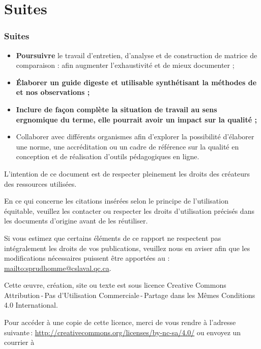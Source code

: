 					\section{Suites} 
						\begin{frame}[allowframebreaks]
						\frametitle{Suites}
                        			
                        			\begin{itemize}
                        			\item \textbf{Poursuivre} le travail d’entretien, d’analyse et de construction de matrice de comparaison : afin augmenter l’exhaustivité et de mieux documenter ;
                        			\item \textbf{Élaborer un guide digeste et utilisable synthétisant la méthodes de \citet{bonneau2013a} et nos observations ;}
                        			\item \textbf{Inclure de façon complète la situation de travail au sens ergnomique du terme, elle pourrait avoir un impact sur la qualité ;}
						\item Collaborer avec différents organismes afin d’explorer la possibilité d’élaborer une norme, une accréditation ou un cadre de référence sur la qualité en conception et de réalisation d’outils pédagogiques en ligne.
                        				
						\end{itemize}
						\end{frame}									
						
\framebreak
\par L’intention de ce document est de respecter pleinement les droits des créateurs des ressources
utilisées.
	\par En ce qui concerne les citations insérées selon le principe de l'utilisation équitable, veuillez les contacter ou respecter les droits d’utilisation précisés dans les documents d’origine avant de les réutiliser.
	\par Si vous estimez que certains éléments de ce rapport ne respectent pas intégralement les droits de vos
publications, veuillez nous en aviser afin que les modifications nécessaires puissent être apportées au : \url{mailto:sprudhomme@cslaval.qc.ca}.
	\par Cette \oe uvre, création, site ou texte est sous licence Creative Commons Attribution\,-\,Pas d’Utilisation Commerciale\,-\,Partage dans les Mêmes Conditions 4.0 International. \\
	\par 
	 Pour accéder à une copie de cette licence, merci de vous rendre à l'adresse suivante\,: \url{http://creativecommons.org/licenses/by-nc-sa/4.0/} ou envoyez un courrier à 

